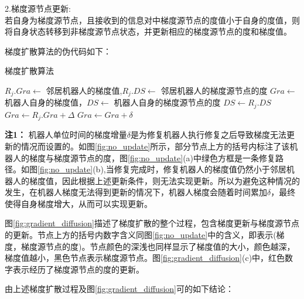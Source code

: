 2.梯度源节点更新:\\
\indent 若自身为梯度源节点，且接收到的信息对中梯度源节点的度值小于自身的度值，则将自身状态转移到非梯度源节点状态，并更新相应的梯度源节点的度和梯度值。

梯度扩散算法的伪代码如下：\\
\begin{algorithm}
	\caption{梯度扩散算法}
	\label{algorithm:gradient_diffusion}
	\begin{algorithmic}[1]
		\Require $R_j.Gra \leftarrow$ 邻居机器人的梯度值,$R_j.DS \leftarrow$  邻居机器人的梯度源节点的度
		\Ensure $Gra \leftarrow$ 机器人自身的梯度值，$DS \leftarrow$  机器人自身的梯度源节点的度
				\State $DS \gets R_j.DS$
				\State $Gra \gets R_j.Gra + \Delta$
			\Else
				\State $Gra \gets Gra + \delta$
			\EndIf		
			\State {}
		\EndFunction
	\end{algorithmic}
\end{algorithm}

\textbf{注1：} \indent 机器人单位时间的梯度增量$\delta$是为修复机器人执行修复之后导致梯度无法更新的情况而设置的。如图\ref{fig:no_update}所示，部分节点上方的括号内标注了该机器人的梯度与梯度源节点的度，图\ref{fig:no_update}(a)中绿色方框是一条修复路径。如图\ref{fig:no_update}(b),当修复完成时，修复机器人的梯度值仍然小于邻居机器人的梯度值，因此根据上述更新条件，则无法实现更新。所以为避免这种情况的发生，在机器人梯度无法得到更新的情况下，机器人梯度会随着时间累加$\delta$，最终使得自身梯度增大，从而可以实现更新。
\begin{figure*}[!htbp]
	\centering
	\hspace{1cm}
\end{figure*}

图\ref{fig:gradient_diffusion}描述了梯度扩散的整个过程，包含梯度更新与梯度源节点的更新。节点上方的括号内数字含义同图\ref{fig:no_update}中的含义，即表示(梯度，梯度源节点的度)。节点颜色的深浅也同样显示了梯度值的大小，颜色越深，梯度值越小，黑色节点表示梯度源节点。图\ref{fig:gradient_diffusion}(c)中，红色数字表示经历了梯度源节点的度的更新。
\begin{figure*}[!htbp]
	\centering
	\hspace{0.5cm}
	\hspace{0.5cm}
\end{figure*}
由上述梯度扩散过程及图\ref{fig:gradient_diffusion}可的如下结论：

